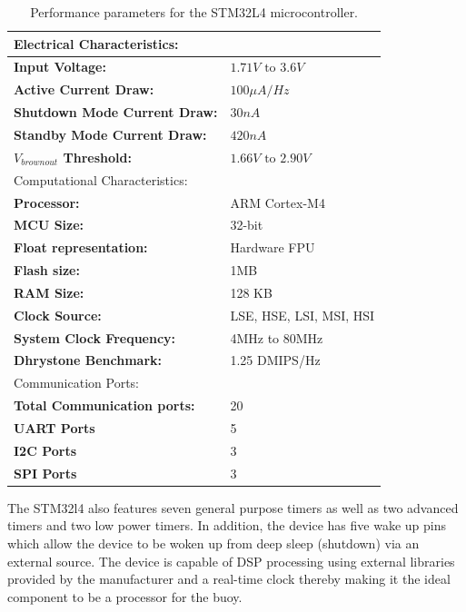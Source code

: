  \begin{table}[H]
     \centering
     \caption{Performance parameters for the STM32L4 microcontroller. }
     \begin{tabular}{|l | l|}
     \multicolumn{2}{l}{Electrical Characteristics:}\\
     \hline
      \textbf{Input Voltage: }    & $1.71V \text{ to } 3.6V$ \\
      \hline
      \textbf{Active Current Draw: }    & $100 \mu A/Hz$ \\
      \hline
      \textbf{Shutdown Mode Current Draw: }    &  $30nA$ \\
      \hline
      \textbf{Standby Mode Current Draw: }    &  $420nA$ \\
      \hline
      \textbf{$V_{brownout}$ Threshold:} &  $1.66V \text{ to } 2.90V$\\
      \hline
       \multicolumn{2}{l}{Computational Characteristics:}\\
     \hline
     \textbf{Processor: }    &  ARM Cortex-M4 \\
     \hline
     \textbf{MCU Size: }     & 32-bit\\
     \hline
     \textbf{Float representation: } & Hardware FPU \\
     \hline
     \textbf{Flash size: } & 1MB\\
     \hline
     \textbf{RAM Size:} & 128 KB\\
     \hline
     \textbf{Clock Source: } & LSE, HSE, LSI, MSI, HSI \\
     \hline
     \textbf{System Clock Frequency: } & 4MHz to 80MHz \\
     \hline
     \textbf{Dhrystone Benchmark: } & 1.25 DMIPS/Hz \\
     \hline
     \multicolumn{2}{l}{Communication Ports:} \\
     \hline
     \textbf{Total  Communication ports: } & 20 \\
     \hline
     \textbf{UART Ports} & 5 \\
     \hline
     \textbf{I2C Ports} & 3 \\
     \hline
     \textbf{SPI Ports} & 3 \\
     \hline
     \end{tabular}

     \label{tab:stm_spec}
 \end{table}
 
 The STM32l4 also features seven general purpose timers as well as two advanced timers and two low power timers. In addition, the device has five wake up pins which allow the device to be woken up from deep sleep (shutdown) via an external source. The device is capable of DSP processing using external libraries provided by the manufacturer and a real-time clock thereby making it the ideal component to be a processor for the buoy.
 
